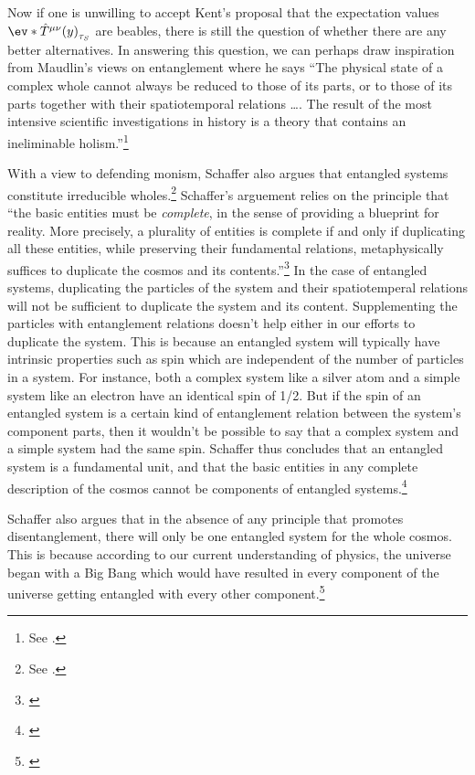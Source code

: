 Now if one is unwilling to accept Kent's proposal that the expectation values $\ev*{\hat{T}^{\mu\nu}(y)}_{\tau_S}$ are beables, there is still the question of whether there are any better alternatives. In answering this question, we can perhaps draw inspiration from Maudlin's views on entanglement where he says ``The physical state of a complex whole cannot always be reduced to those of its parts, or to those of its parts together with their spatiotemporal relations \ldots. The result of the most intensive scientific investigations in history is a theory that contains an ineliminable holism.''\footnote{See \cite[56]{Maudlin2}.}  

With a view to defending monism, Schaffer also argues that entangled systems constitute irreducible wholes.\footnote{See \cite{SchafferJonathan2010MTPo}.} Schaffer's arguement relies on the principle that ``the basic entities must be \emph{complete}, in the sense of providing a blueprint for reality. More precisely, a plurality of entities is complete if and only if duplicating all these entities, while preserving their fundamental relations, metaphysically suffices to duplicate the cosmos and its contents.''\footnote{\cite[39]{SchafferJonathan2010MTPo}} In the case of entangled systems, duplicating the particles of the system and their spatiotemperal relations will not be sufficient to duplicate the system and its content. Supplementing the particles with entanglement relations doesn't help either in our efforts to duplicate the system. This is because an entangled system will typically have intrinsic properties such as spin which are independent of the number of particles in a system. For instance, both a complex system like a silver atom and a simple system like an electron have an identical spin of 1/2. But if the spin of an entangled system is a certain kind of entanglement relation between the system's component parts, then it wouldn't be possible to say that a complex system and a simple system had the same spin. Schaffer thus concludes that an entangled system is a fundamental unit, and that the basic entities in any complete description of the cosmos cannot be components of entangled systems.\footnote{\cite[54]{SchafferJonathan2010MTPo}}  

Schaffer also argues that in the absence of any principle that promotes disentanglement, there will only be one entangled system for the whole cosmos. This is because according to our current understanding of physics, the universe began with a Big Bang which would have resulted in every component of the universe getting entangled with every other component.\footnote{\cite[52]{SchafferJonathan2010MTPo}}  

